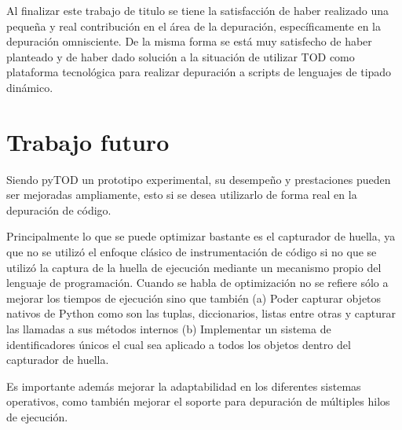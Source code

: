 \documentclass[12pt,legalpaper]{report}
\begin{document}
Al finalizar este trabajo de titulo se tiene la satisfacción de haber realizado una pequeña y real contribución en el área de la depuración, específicamente en la depuración omnisciente.  De la misma forma se está muy satisfecho de haber planteado y de haber dado solución a la situación de utilizar TOD como plataforma tecnológica para realizar depuración a scripts de lenguajes de tipado dinámico.

\chapter{Trabajo futuro}

Siendo pyTOD un prototipo experimental, su desempeño y prestaciones pueden ser mejoradas ampliamente, esto si se desea utilizarlo de forma real en la depuración de código.  

Principalmente lo que se puede optimizar bastante es el capturador de huella, ya que no se utilizó el enfoque clásico de instrumentación de código si no que se utilizó la captura de la huella de ejecución mediante un mecanismo propio del lenguaje de programación.  Cuando se habla de optimización no se refiere sólo a mejorar los tiempos de ejecución sino que también (a) Poder capturar objetos nativos de Python como son las tuplas, diccionarios, listas entre otras y capturar las llamadas a sus métodos internos (b) Implementar un sistema de identificadores únicos el cual sea aplicado a todos los objetos dentro del capturador de huella.  

Es importante además mejorar la adaptabilidad en los diferentes sistemas operativos, como también mejorar el soporte para depuración de múltiples hilos de ejecución. 

\newpage
\end{document}
